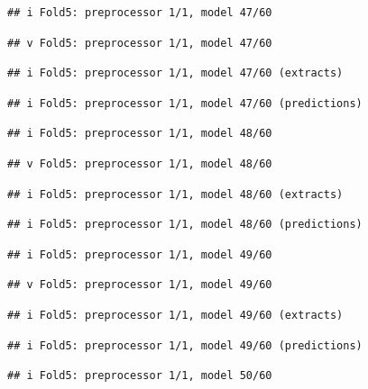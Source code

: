 \documentclass[
]{article}
\begin{document}
\begin{verbatim}
## i Fold5: preprocessor 1/1, model 47/60
\end{verbatim}

\begin{verbatim}
## v Fold5: preprocessor 1/1, model 47/60
\end{verbatim}

\begin{verbatim}
## i Fold5: preprocessor 1/1, model 47/60 (extracts)
\end{verbatim}

\begin{verbatim}
## i Fold5: preprocessor 1/1, model 47/60 (predictions)
\end{verbatim}

\begin{verbatim}
## i Fold5: preprocessor 1/1, model 48/60
\end{verbatim}

\begin{verbatim}
## v Fold5: preprocessor 1/1, model 48/60
\end{verbatim}

\begin{verbatim}
## i Fold5: preprocessor 1/1, model 48/60 (extracts)
\end{verbatim}

\begin{verbatim}
## i Fold5: preprocessor 1/1, model 48/60 (predictions)
\end{verbatim}

\begin{verbatim}
## i Fold5: preprocessor 1/1, model 49/60
\end{verbatim}

\begin{verbatim}
## v Fold5: preprocessor 1/1, model 49/60
\end{verbatim}

\begin{verbatim}
## i Fold5: preprocessor 1/1, model 49/60 (extracts)
\end{verbatim}

\begin{verbatim}
## i Fold5: preprocessor 1/1, model 49/60 (predictions)
\end{verbatim}

\begin{verbatim}
## i Fold5: preprocessor 1/1, model 50/60
\end{verbatim}
\end{document}
